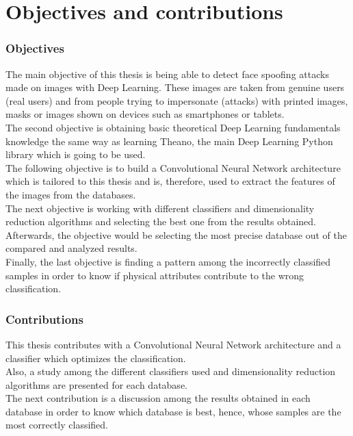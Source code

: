 \section{Objectives and contributions}
\subsubsection{Objectives}
The main objective of this thesis is being able to detect face spoofing attacks made on images with Deep Learning. These images are taken from genuine users (real users) and from people trying to impersonate (attacks) with printed images, masks or images shown on devices such as smartphones or tablets.\\

The second objective is obtaining basic theoretical Deep Learning fundamentals knowledge the same way as learning Theano, the main Deep Learning Python library which is going to be used.\\

The following objective is to build a Convolutional Neural Network architecture which is tailored to this thesis and is, therefore, used to extract the features of the images from the databases.\\

The next objective is working with different classifiers and dimensionality reduction algorithms and selecting the best one from the results obtained.\\

Afterwards, the objective would be selecting the most precise database out of the compared and analyzed results.\\

Finally, the last objective is finding a pattern among the incorrectly classified samples in order to know if physical attributes contribute to the wrong classification.

\subsubsection{Contributions}
This thesis contributes with a Convolutional Neural Network architecture and a classifier which optimizes the classification.\\

Also, a study among the different classifiers used and dimensionality reduction algorithms are presented for each database.\\

The next contribution is a discussion among the results obtained in  each database in order to know which database is best, hence, whose samples are the most correctly classified.

